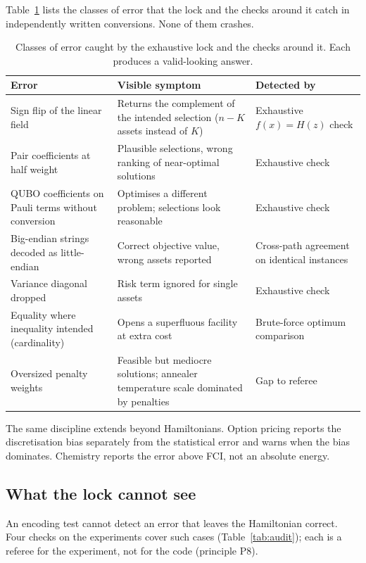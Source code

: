 \documentclass[11pt,a4paper]{article}
\begin{document}
Table~\ref{tab:defects} lists the classes of error that the lock and the
checks around it catch in independently written conversions. None of them
crashes.

\begin{table}[H]
\centering\small
\begin{tabular}{p{4.2cm}p{5.0cm}p{4.6cm}}
\toprule
Error & Visible symptom & Detected by \\
\midrule
Sign flip of the linear field & Returns the complement of the intended selection ($n-K$ assets instead of $K$) & Exhaustive $f(x)=H(z)$ check \\
Pair coefficients at half weight & Plausible selections, wrong ranking of near-optimal solutions & Exhaustive check \\
QUBO coefficients on Pauli terms without conversion & Optimises a different problem; selections look reasonable & Exhaustive check \\
Big-endian strings decoded as little-endian & Correct objective value, wrong assets reported & Cross-path agreement on identical instances \\
Variance diagonal dropped & Risk term ignored for single assets & Exhaustive check \\
Equality where inequality intended (cardinality) & Opens a superfluous facility at extra cost & Brute-force optimum comparison \\
Oversized penalty weights & Feasible but mediocre solutions; annealer temperature scale dominated by penalties & Gap to referee \\
\bottomrule
\end{tabular}
\caption{Classes of error caught by the exhaustive lock and the checks
around it. Each produces a valid-looking answer.}
\label{tab:defects}
\end{table}

The same discipline extends beyond Hamiltonians. Option pricing reports the
discretisation bias separately from the statistical error and warns when the
bias dominates. Chemistry reports the error above FCI, not an absolute energy.

\subsection{What the lock cannot see}
\label{sec:audit}

An encoding test cannot detect an error that leaves the Hamiltonian correct.
Four checks on the experiments cover such cases (Table~\ref{tab:audit});
each is a referee for the experiment, not for the code (principle P8).
\end{document}
